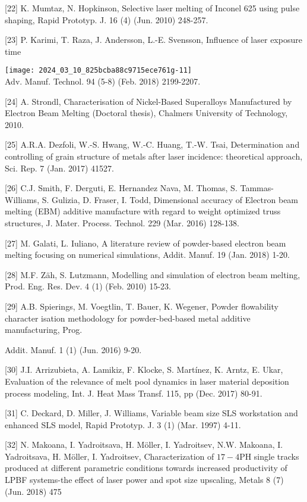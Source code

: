 \documentclass[10pt]{article}
\begin{document}
[22] K. Mumtaz, N. Hopkinson, Selective laser melting of Inconel 625 using pulse shaping, Rapid Prototyp. J. 16 (4) (Jun. 2010) 248-257.

[23] P. Karimi, T. Raza, J. Andersson, L.-E. Svensson, Influence of laser exposure time

\texttt{[image: 2024\_03\_10\_825bcba88c9715ece761g-11]}\\
Adv. Manuf. Technol. 94 (5-8) (Feb. 2018) 2199-2207.

[24] A. Strondl, Characterisation of Nickel-Based Superalloys Manufactured by Electron Beam Melting (Doctoral thesis), Chalmers University of Technology, 2010.

[25] A.R.A. Dezfoli, W.-S. Hwang, W.-C. Huang, T.-W. Tsai, Determination and controlling of grain structure of metals after laser incidence: theoretical approach, Sci. Rep. 7 (Jan. 2017) 41527.

[26] C.J. Smith, F. Derguti, E. Hernandez Nava, M. Thomas, S. Tammas-Williams, S. Gulizia, D. Fraser, I. Todd, Dimensional accuracy of Electron beam melting (EBM) additive manufacture with regard to weight optimized truss structures, J. Mater. Process. Technol. 229 (Mar. 2016) 128-138.

[27] M. Galati, L. Iuliano, A literature review of powder-based electron beam melting focusing on numerical simulations, Addit. Manuf. 19 (Jan. 2018) 1-20.

[28] M.F. Zäh, S. Lutzmann, Modelling and simulation of electron beam melting, Prod. Eng. Res. Dev. 4 (1) (Feb. 2010) 15-23.

[29] A.B. Spierings, M. Voegtlin, T. Bauer, K. Wegener, Powder flowability character isation methodology for powder-bed-based metal additive manufacturing, Prog.

Addit. Manuf. 1 (1) (Jun. 2016) 9-20.

[30] J.I. Arrizubieta, A. Lamikiz, F. Klocke, S. Martínez, K. Arntz, E. Ukar, Evaluation of the relevance of melt pool dynamics in laser material deposition process modeling, Int. J. Heat Mass Transf. 115, pp (Dec. 2017) 80-91.

[31] C. Deckard, D. Miller, J. Williams, Variable beam size SLS workstation and enhanced SLS model, Rapid Prototyp. J. 3 (1) (Mar. 1997) 4-11.

[32] N. Makoana, I. Yadroitsava, H. Möller, I. Yadroitsev, N.W. Makoana, I. Yadroitsava, H. Möller, I. Yadroitsev, Characterization of $17-4 \mathrm{PH}$ single tracks produced at different parametric conditions towards increased productivity of LPBF systems-the effect of laser power and spot size upscaling, Metals 8 (7) (Jun. 2018) 475
\end{document}
